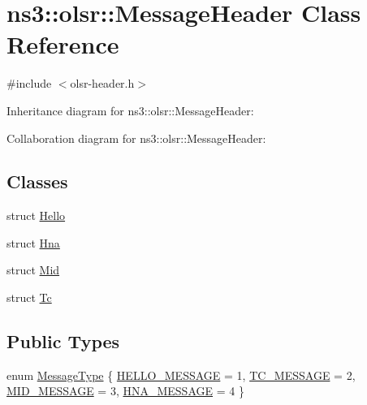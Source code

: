 \hypertarget{classns3_1_1olsr_1_1MessageHeader}{}\section{ns3\+:\+:olsr\+:\+:Message\+Header Class Reference}
\label{classns3_1_1olsr_1_1MessageHeader}


{\ttfamily \#include $<$olsr-\/header.\+h$>$}



Inheritance diagram for ns3\+:\+:olsr\+:\+:Message\+Header\+:


Collaboration diagram for ns3\+:\+:olsr\+:\+:Message\+Header\+:
\subsection*{Classes}
\begin{DoxyCompactItemize}
\item 
struct \hyperlink{structns3_1_1olsr_1_1MessageHeader_1_1Hello}{Hello}
\item 
struct \hyperlink{structns3_1_1olsr_1_1MessageHeader_1_1Hna}{Hna}
\item 
struct \hyperlink{structns3_1_1olsr_1_1MessageHeader_1_1Mid}{Mid}
\item 
struct \hyperlink{structns3_1_1olsr_1_1MessageHeader_1_1Tc}{Tc}
\end{DoxyCompactItemize}
\subsection*{Public Types}
\begin{DoxyCompactItemize}
\item 
enum \hyperlink{classns3_1_1olsr_1_1MessageHeader_aff5a31b07c415097a5ada41d53e9a99e}{Message\+Type} \{ \hyperlink{classns3_1_1olsr_1_1MessageHeader_aff5a31b07c415097a5ada41d53e9a99ea95ef9dc453d91d351d1a35cc4650e192}{H\+E\+L\+L\+O\+\_\+\+M\+E\+S\+S\+A\+GE} = 1, 
\hyperlink{classns3_1_1olsr_1_1MessageHeader_aff5a31b07c415097a5ada41d53e9a99ea079e75713d9846b17df8b9d722ee5ab3}{T\+C\+\_\+\+M\+E\+S\+S\+A\+GE} = 2, 
\hyperlink{classns3_1_1olsr_1_1MessageHeader_aff5a31b07c415097a5ada41d53e9a99ea56ed595e1305b9889be591227fb9997b}{M\+I\+D\+\_\+\+M\+E\+S\+S\+A\+GE} = 3, 
\hyperlink{classns3_1_1olsr_1_1MessageHeader_aff5a31b07c415097a5ada41d53e9a99ea12c3f411859a1e9cc5b5442a7fdd2f89}{H\+N\+A\+\_\+\+M\+E\+S\+S\+A\+GE} = 4
 \}
\end{DoxyCompactItemize}
